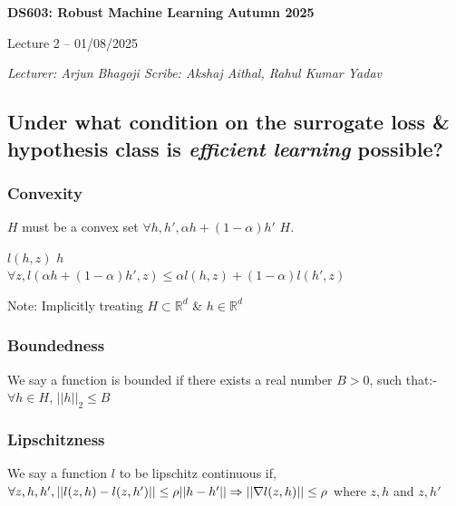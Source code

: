 \documentclass[11pt]{article}
\theoremstyle{plain}
\begin{document}
\thispagestyle{plain}

\begin{tcolorbox}[colback=white, colframe=black, boxrule=1pt, sharp corners]
\textbf{DS603: Robust Machine Learning} \hfill \textbf{Autumn 2025}
\begin{center}
\vspace{2mm}
Lecture 2 -- 01/08/2025
\end{center}
\vspace{2mm}
\noindent\textit{Lecturer: Arjun Bhagoji \hfill Scribe: Akshaj Aithal, Rahul Kumar Yadav}
\end{tcolorbox}

\subsection{Under what condition on the surrogate loss \& hypothesis class is \textit{efficient learning} possible?}

\subsubsection{ Convexity}\label{sec:Convexity}
    \item $H$ must be a convex set \Rightarrow $\forall h, h',\alpha h + (1-\alpha)h'$ \in $H$. 
    \item $l(h,z)$  $h$ \\ \Rightarrow $\forall z, l(\alpha h+(1-\alpha)h',z) \leq \alpha l(h,z) + (1-\alpha)l(h',z)$

\small{Note: Implicitly treating $H\subset\mathbb{R}^d$ \& $h\in \mathbb{R}^d$}

\subsubsection{Boundedness}\label{sec:Boundedness}
We say a function is bounded if there exists a real number $B > 0$, such that:-
$\forall h \in H$, $\lvert\lvert h \rvert\rvert_2 \leq B$

\subsubsection{Lipschitzness}\label{sec:Lipschitzness}
We say a function $l$ to be lipschitz continuous if, 
$\forall z,h,h', \lvert\lvert l(z,h) - l(z,h') \rvert\rvert \leq \rho\lvert\lvert h-h'\rvert\rvert \\
\Rightarrow \lvert\lvert\nabla l(z,h)\rvert\rvert \leq \rho$ where ${z,h}$ and ${z, h'}$ \in {} 
\end{document}
